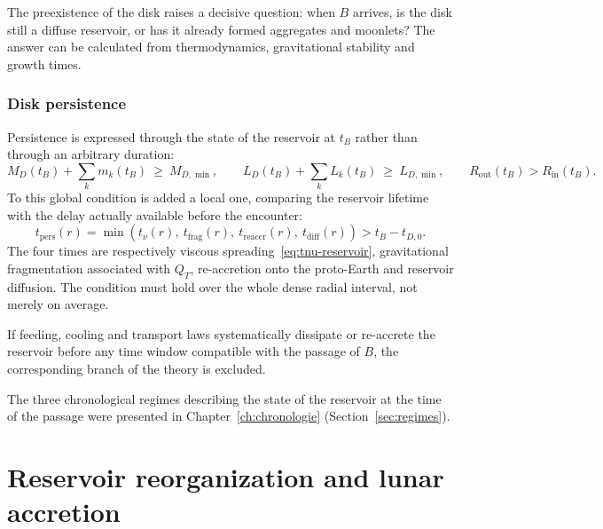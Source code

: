\documentclass[11pt,a4paper,openany]{report}
\begin{document}
\begin{ideephys}
The preexistence of the disk raises a decisive question: when $B$ arrives, is the disk still a
diffuse reservoir, or has it already formed aggregates and moonlets? The answer can be calculated
from thermodynamics, gravitational stability and growth times.
\end{ideephys}

\subsection{Disk persistence}

Persistence is expressed through the state of the reservoir at $t_B$ rather than through an
arbitrary duration:
\begin{equation}
M_D(t_B)+\sum_k m_k(t_B)\ \ge\ M_{D,\min},\qquad
L_D(t_B)+\sum_k L_k(t_B)\ \ge\ L_{D,\min},\qquad
R_{\mathrm{out}}(t_B)>R_{\mathrm{in}}(t_B).
\label{eq:persistance}
\end{equation}
To this global condition is added a local one, comparing the reservoir lifetime with the delay
actually available before the encounter:
\begin{equation}
\boxed{\;
t_{\mathrm{pers}}(r)=
\min\!\left(t_\nu(r),\ t_{\mathrm{frag}}(r),\ t_{\mathrm{reaccr}}(r),\ t_{\mathrm{diff}}(r)\right)
>t_B-t_{D,0}.
\;}
\label{eq:tpers}
\end{equation}
The four times are respectively viscous spreading~\eqref{eq:tnu-reservoir}, gravitational
fragmentation associated with $Q_T$, re-accretion onto the proto-Earth and reservoir diffusion. The
condition must hold over the whole dense radial interval, not merely on average.

\begin{falsif}
If feeding, cooling and transport laws systematically dissipate or re-accrete the reservoir before
any time window compatible with the passage of $B$, the corresponding branch of the theory is
excluded.
\end{falsif}

The three chronological regimes describing the state of the reservoir at the time of the passage
were presented in Chapter~\ref{ch:chronologie} (Section~\ref{sec:regimes}).

\chapter{Reservoir reorganization and lunar accretion}
\label{ch:reorganisation}
\end{document}
